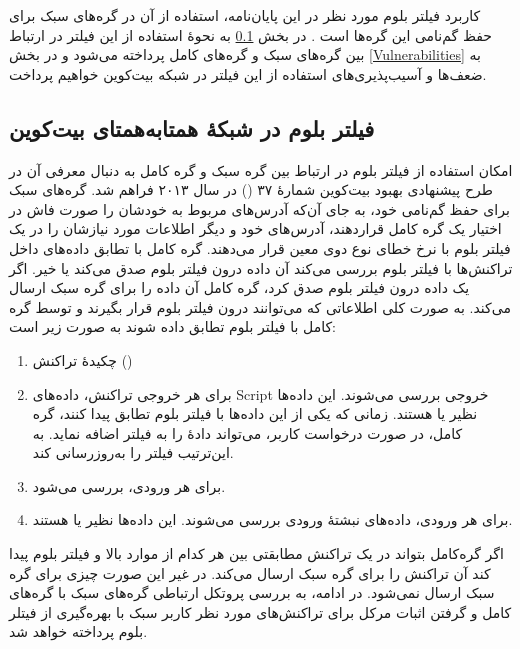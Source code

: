 کاربرد فیلتر بلوم مورد نظر در این پایان‌نامه، استفاده از آن در گره‌های سبک برای حفظ گم‌نامی این گره‌ها است \cite{Hearn2013}. در بخش‌  \ref{BloomFilterInP2P} به نحوهٔ استفاده از این فیلتر در ارتباط بین گره‌های سبک و گره‌های کامل پرداخته می‌شود و در بخش \ref{Vulnerabilities} به ضعف‌ها و آسیب‌پذیری‌های استفاده از این فیلتر در شبکه بیت‌کوین خواهیم پرداخت. 


\subsection{فیلتر بلوم در شبکهٔ همتا‌به‌همتای بیت‌کوین}
\label{BloomFilterInP2P}

امکان استفاده از فیلتر بلوم در ارتباط بین گره سبک و گره کامل به دنبال معرفی آن در طرح پیشنهادی بهبود بیت‌کوین شمارهٔ ۳۷ () \cite{Hearn2013} در سال ۲۰۱۳ فراهم شد.  گره‌‌های سبک برای حفظ گم‌نامی خود، به جای آن‌که آدرس‌های مربوط به خودشان را صورت فاش در اختیار یک گره کامل قراردهند، آدرس‌های خود و دیگر اطلاعات مورد نیازشان را در یک فیلتر بلوم با نرخ خطای نوع دوی معین قرار می‌دهند. گره کامل با تطابق داده‌های داخل تراکنش‌ها با فیلتر بلوم بررسی می‌کند آن داده درون فیلتر بلوم صدق می‌کند یا خیر. اگر یک داده درون فیلتر بلوم صدق کرد، گره کامل آن داده را برای گره سبک ارسال می‌کند. به صورت کلی اطلاعاتی که می‌توانند درون فیلتر بلوم قرار بگیرند و توسط گره کامل با فیلتر بلوم تطابق داده ‌شوند به صورت زیر است:
\begin{enumerate}
\item{%
چکیدهٔ تراکنش‌ ()}
\item{%
برای هر خروجی تراکنش، داده‌های
\gls{Script}
خروجی بررسی می‌شوند. این داده‌ها نظیر  یا  هستند. زمانی که یکی از این داده‌ها با فیلتر بلوم تطابق پیدا کنند، گره کامل، در صورت درخواست کاربر، می‌تواند دادهٔ  را به فیلتر اضافه نماید. به این‌ترتیب فیلتر را به‌روزرسانی کند.
}
\item{%
برای هر ورودی،  بررسی می‌شود.
}
\item{%
برای هر ورودی، داده‌های نبشتهٔ ورودی بررسی می‌شوند. این داده‌ها نظیر 
یا
هستند.
}
\end{enumerate} 

اگر گره‌کامل بتواند در یک تراکنش مطابقتی بین هر کدام از موارد بالا و فیلتر بلوم پیدا کند آن تراکنش را برای گره سبک ارسال می‌کند. در غیر این صورت چیزی برای گره سبک ارسال نمی‌شود. در ادامه، به بررسی پروتکل ارتباطی گره‌های سبک با گره‌های کامل و گرفتن اثبات مرکل  برای تراکنش‌های مورد نظر کاربر سبک با بهره‌گیری از فیتلر بلوم پرداخته خواهد شد. 

